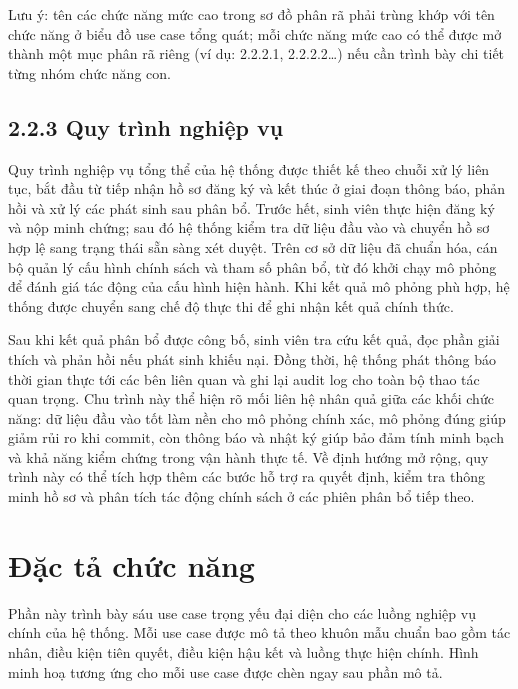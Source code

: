 \documentclass[a4paper,12pt,openany,oneside]{report}
\begin{document}
Lưu ý: tên các chức năng mức cao trong sơ đồ phân rã phải trùng khớp với tên chức năng ở biểu đồ use case tổng quát; mỗi chức năng mức cao có thể được mở thành một mục phân rã riêng (ví dụ: 2.2.2.1, 2.2.2.2…) nếu cần trình bày chi tiết từng nhóm chức năng con.

\subsection*{2.2.3 Quy trình nghiệp vụ}

Quy trình nghiệp vụ tổng thể của hệ thống được thiết kế theo chuỗi xử lý liên tục, bắt đầu từ tiếp nhận hồ sơ đăng ký và kết thúc ở giai đoạn thông báo, phản hồi và xử lý các phát sinh sau phân bổ. Trước hết, sinh viên thực hiện đăng ký và nộp minh chứng; sau đó hệ thống kiểm tra dữ liệu đầu vào và chuyển hồ sơ hợp lệ sang trạng thái sẵn sàng xét duyệt. Trên cơ sở dữ liệu đã chuẩn hóa, cán bộ quản lý cấu hình chính sách và tham số phân bổ, từ đó khởi chạy mô phỏng để đánh giá tác động của cấu hình hiện hành. Khi kết quả mô phỏng phù hợp, hệ thống được chuyển sang chế độ thực thi để ghi nhận kết quả chính thức.

Sau khi kết quả phân bổ được công bố, sinh viên tra cứu kết quả, đọc phần giải thích và phản hồi nếu phát sinh khiếu nại. Đồng thời, hệ thống phát thông báo thời gian thực tới các bên liên quan và ghi lại audit log cho toàn bộ thao tác quan trọng. Chu trình này thể hiện rõ mối liên hệ nhân quả giữa các khối chức năng: dữ liệu đầu vào tốt làm nền cho mô phỏng chính xác, mô phỏng đúng giúp giảm rủi ro khi commit, còn thông báo và nhật ký giúp bảo đảm tính minh bạch và khả năng kiểm chứng trong vận hành thực tế. Về định hướng mở rộng, quy trình này có thể tích hợp thêm các bước hỗ trợ ra quyết định, kiểm tra thông minh hồ sơ và phân tích tác động chính sách ở các phiên phân bổ tiếp theo.

\section{Đặc tả chức năng}

Phần này trình bày sáu use case trọng yếu đại diện cho các luồng nghiệp vụ chính của hệ thống. Mỗi use case được mô tả theo khuôn mẫu chuẩn bao gồm tác nhân, điều kiện tiên quyết, điều kiện hậu kết và luồng thực hiện chính. Hình minh hoạ tương ứng cho mỗi use case được chèn ngay sau phần mô tả.
\end{document}
